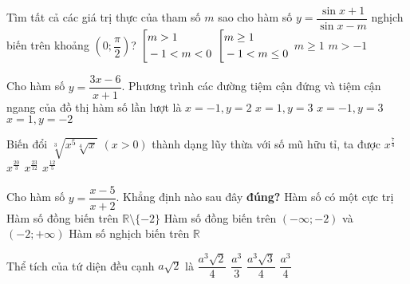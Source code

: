 \begin{ex}%
	Tìm tất cả các giá trị thực của tham số $m$ sao cho hàm số $y=\dfrac{\sin{x}+1}{\sin{x}-m}$ nghịch biến trên khoảng $\left( 0;\dfrac{\pi}{2} \right)$?
	\choice
	{$\left[\begin{aligned}&m>1\\&-1<m<0\end{aligned}\right.$}
	{\True $\left[\begin{aligned}&m\geq 1\\&-1<m\leq 0\end{aligned}\right.$}
	{$m\geq 1$}
	{$m>-1$}
\end{ex} 

\begin{ex}%
	Cho hàm số $y=\dfrac{3x-6}{x+1}$. Phương trình các đường tiệm cận đứng và tiệm cận ngang của đồ thị hàm số lần lượt là
	\choice
	{$x=-1, y=2$}
	{$x=1,y=3$}
	{\True $x=-1, y=3$}
	{$x=1, y=-2$}
\end{ex}

\begin{ex}%
	Biến đổi $\sqrt[3]{x^5\sqrt[4]{x}}$ $(x>0)$ thành dạng lũy thừa với số mũ hữu tỉ, ta được
	\choice
	{\True $x^{\frac{7}{4}}$}
	{$x^{\frac{20}{3}}$}
	{$x^{\frac{23}{12}}$}
	{$x^{\frac{12}{5}}$}
\end{ex}

\begin{ex}%
	Cho hàm số $y=\dfrac{x-5}{x+2}$. Khẳng định nào sau đây \textbf{đúng?}
	\choice
	{Hàm số có một cực trị}
	{Hàm số đồng biến trên $\mathbb{R} \setminus \{-2\}$}
	{\True Hàm số đồng biến trên $(-\infty;-2)$ và $(-2;+\infty)$}
	{Hàm số nghịch biến trên $\mathbb{R}$}
\end{ex}

\begin{ex}%
	Thể tích của tứ diện đều cạnh $a\sqrt{2}$ là
	\choice
	{$\dfrac{a^3\sqrt{2}}{4}$}
	{\True  $\dfrac{a^3}{3}$}
	{$\dfrac{a^3\sqrt{3}}{4}$}
	{$\dfrac{a^3}{4}$}
\end{ex}

